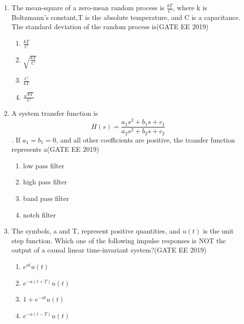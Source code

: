 \documentclass[a4paper,10pt]{exam}
\theoremstyle{remark}
\begin{document}
\begin{enumerate}
\begin{enumerate}[label=\arabic*.]
\begin{multicols}{4}
\begin{enumerate}
\item $\frac{z^{2}-1}{z}$
\item $\frac{z^{2}-1}{z+2}$
\item $\frac{z^{2}-1}{z-0.5}$
\item $\frac{z^{2}-1}{z+j0.5}$
\end{enumerate}
\end{multicols}
\item The mean-square of a zero-mean random process is $ \frac{kT}{C} $, where k is Boltzmann's constant,T is the absolute temperature, and C is a capacitance. The standard deviation of the random process is\hfill{(GATE EE 2019)}
\begin{multicols}{4}
\begin{enumerate}
\item $\frac{kT}{C}$
\item $\sqrt{\frac{kT}{C}}$
\item $\frac{C}{kT}$
\item $\frac{\sqrt{kT}}{C}$
\end{enumerate}
\end{multicols}
\item 
A system transfer function is $$ H(s) = \frac{a_1 s^2 + b_1 s + c_1}{a_2 s^2 + b_2 s + c_2} $$. If $ a_1 = b_1 = 0 $, and all other coefficients are positive, the transfer function represents a\hfill{(GATE EE 2019)}
\begin{enumerate}
\item low pass filter
\item high pass filter
\item band pass filter
\item notch filter
\end{enumerate}
\item The symbols,  a and T, represent positive quantities, and $u(t)$ is the unit step function. Which one of the following impulse responses is NOT the output of a causal linear time-invariant system?\hfill{(GATE EE 2019)}
\begin{multicols}{2}
\begin{enumerate}
\item $e^{a t}u(t)$
\item $e^{-a(t+T)}u(t)$
\item $1 + e^{-a t}u(t)$
\item $e^{-a(t-T)}u(t)$
\end{enumerate}
\end{multicols}

\end{enumerate}
\end{enumerate}
\end{document}
